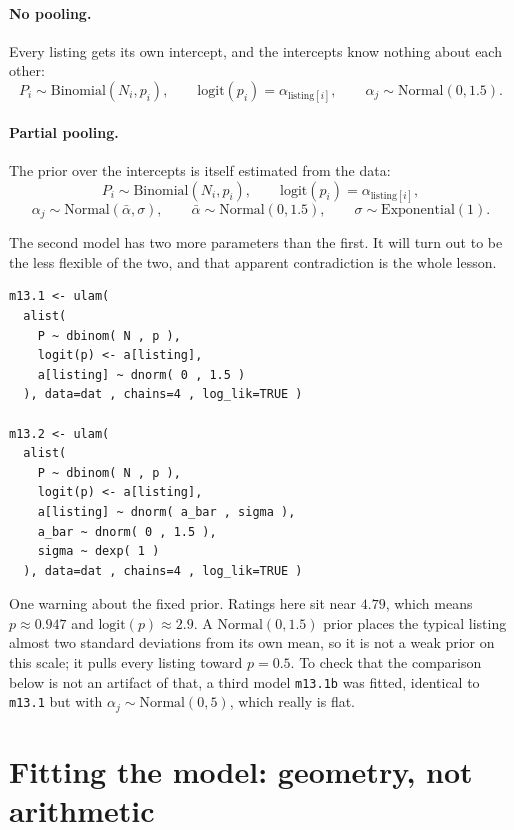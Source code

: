 \documentclass[11pt,a4paper]{article}
\begin{document}
\paragraph{No pooling.} Every listing gets its own intercept, and the intercepts
know nothing about each other:
\[
  P_i \sim \text{Binomial}(N_i, p_i), \qquad
  \text{logit}(p_i) = \alpha_{\text{listing}[i]}, \qquad
  \alpha_j \sim \text{Normal}(0, 1.5).
\]

\paragraph{Partial pooling.} The prior over the intercepts is itself estimated
from the data:
\[
  P_i \sim \text{Binomial}(N_i, p_i), \qquad
  \text{logit}(p_i) = \alpha_{\text{listing}[i]},
\]
\[
  \alpha_j \sim \text{Normal}(\bar\alpha, \sigma), \qquad
  \bar\alpha \sim \text{Normal}(0, 1.5), \qquad
  \sigma \sim \text{Exponential}(1).
\]

The second model has two more parameters than the first. It will turn out to be
the less flexible of the two, and that apparent contradiction is the whole
lesson.

\begin{lstlisting}
m13.1 <- ulam(
  alist(
    P ~ dbinom( N , p ),
    logit(p) <- a[listing],
    a[listing] ~ dnorm( 0 , 1.5 )
  ), data=dat , chains=4 , log_lik=TRUE )

m13.2 <- ulam(
  alist(
    P ~ dbinom( N , p ),
    logit(p) <- a[listing],
    a[listing] ~ dnorm( a_bar , sigma ),
    a_bar ~ dnorm( 0 , 1.5 ),
    sigma ~ dexp( 1 )
  ), data=dat , chains=4 , log_lik=TRUE )
\end{lstlisting}

One warning about the fixed prior. Ratings here sit near $4.79$, which means
$p \approx 0.947$ and $\text{logit}(p) \approx 2.9$. A $\text{Normal}(0,1.5)$
prior places the typical listing almost two standard deviations from its own
mean, so it is not a weak prior on this scale; it pulls every listing toward
$p = 0.5$. To check that the comparison below is not an artifact of that, a
third model \texttt{m13.1b} was fitted, identical to \texttt{m13.1} but with
$\alpha_j \sim \text{Normal}(0,5)$, which really is flat.

\section{Fitting the model: geometry, not arithmetic}
\end{document}
